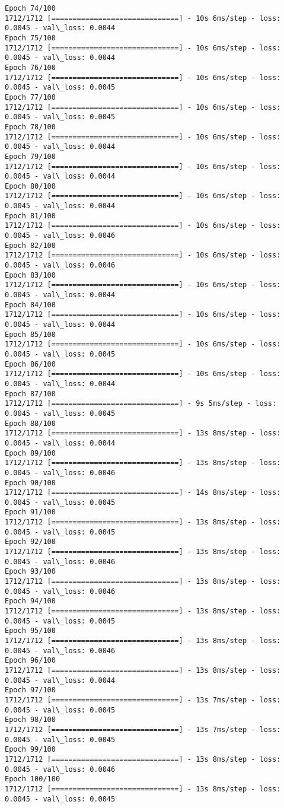 \documentclass[11pt]{article}
\begin{document}
\begin{Verbatim}[commandchars=\\\{\}]
Epoch 74/100
1712/1712 [==============================] - 10s 6ms/step - loss: 0.0045 - val\_loss: 0.0044
Epoch 75/100
1712/1712 [==============================] - 10s 6ms/step - loss: 0.0045 - val\_loss: 0.0044
Epoch 76/100
1712/1712 [==============================] - 10s 6ms/step - loss: 0.0045 - val\_loss: 0.0045
Epoch 77/100
1712/1712 [==============================] - 10s 6ms/step - loss: 0.0045 - val\_loss: 0.0045
Epoch 78/100
1712/1712 [==============================] - 10s 6ms/step - loss: 0.0045 - val\_loss: 0.0044
Epoch 79/100
1712/1712 [==============================] - 10s 6ms/step - loss: 0.0045 - val\_loss: 0.0044
Epoch 80/100
1712/1712 [==============================] - 10s 6ms/step - loss: 0.0045 - val\_loss: 0.0044
Epoch 81/100
1712/1712 [==============================] - 10s 6ms/step - loss: 0.0045 - val\_loss: 0.0046
Epoch 82/100
1712/1712 [==============================] - 10s 6ms/step - loss: 0.0045 - val\_loss: 0.0046
Epoch 83/100
1712/1712 [==============================] - 10s 6ms/step - loss: 0.0045 - val\_loss: 0.0044
Epoch 84/100
1712/1712 [==============================] - 10s 6ms/step - loss: 0.0045 - val\_loss: 0.0044
Epoch 85/100
1712/1712 [==============================] - 10s 6ms/step - loss: 0.0045 - val\_loss: 0.0045
Epoch 86/100
1712/1712 [==============================] - 10s 6ms/step - loss: 0.0045 - val\_loss: 0.0044
Epoch 87/100
1712/1712 [==============================] - 9s 5ms/step - loss: 0.0045 - val\_loss: 0.0045
Epoch 88/100
1712/1712 [==============================] - 13s 8ms/step - loss: 0.0045 - val\_loss: 0.0044
Epoch 89/100
1712/1712 [==============================] - 13s 8ms/step - loss: 0.0045 - val\_loss: 0.0046
Epoch 90/100
1712/1712 [==============================] - 14s 8ms/step - loss: 0.0045 - val\_loss: 0.0045
Epoch 91/100
1712/1712 [==============================] - 13s 8ms/step - loss: 0.0045 - val\_loss: 0.0045
Epoch 92/100
1712/1712 [==============================] - 13s 8ms/step - loss: 0.0045 - val\_loss: 0.0046
Epoch 93/100
1712/1712 [==============================] - 13s 8ms/step - loss: 0.0045 - val\_loss: 0.0046
Epoch 94/100
1712/1712 [==============================] - 13s 8ms/step - loss: 0.0045 - val\_loss: 0.0045
Epoch 95/100
1712/1712 [==============================] - 13s 8ms/step - loss: 0.0045 - val\_loss: 0.0046
Epoch 96/100
1712/1712 [==============================] - 13s 8ms/step - loss: 0.0045 - val\_loss: 0.0044
Epoch 97/100
1712/1712 [==============================] - 13s 7ms/step - loss: 0.0045 - val\_loss: 0.0045
Epoch 98/100
1712/1712 [==============================] - 13s 7ms/step - loss: 0.0045 - val\_loss: 0.0045
Epoch 99/100
1712/1712 [==============================] - 13s 8ms/step - loss: 0.0045 - val\_loss: 0.0046
Epoch 100/100
1712/1712 [==============================] - 13s 8ms/step - loss: 0.0045 - val\_loss: 0.0045

    \end{Verbatim}
\end{document}
